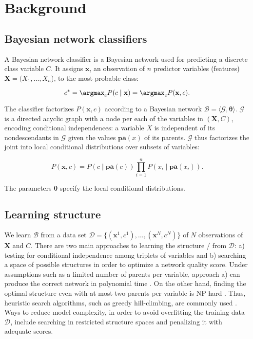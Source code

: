 \section{Background}\label{background}

\label{sec:bcground}

\subsection{Bayesian network
classifiers}\label{bayesian-network-classifiers}

\label{bayesian-networks} A Bayesian network classifier is a Bayesian
network used for predicting a discrete class variable \(C\). It assigns
\(\mathbf{x}\), an observation of \(n\) predictor variables (features)
\(\mathbf{X} = (X_1,\ldots,X_n\)), to the most probable class:

\[ c^* = \argmax_c P(c \mid \mathbf{x}) = \argmax_c P(\mathbf{x}, c).\]

\noindent The classifier factorizes \(P(\mathbf{x}, c)\) according to a
Bayesian network
\(\mathcal{B} = \langle \mathcal{G}, \boldsymbol{ \theta } \rangle\).
\(\mathcal{G}\) is a directed acyclic graph with a node per each of the
variables in \((\mathbf{X}, C)\), encoding conditional independences: a
variable \(X\) is independent of its nondescendants in \(\mathcal{G}\)
given the values \(\mathbf{pa}(x)\) of its parents. \(\mathcal{G}\) thus
factorizes the joint into local conditional distributions over subsets
of variables:

\[P(\mathbf{x}, c) = P(c \mid \mathbf{pa}(c)) \prod_{i=1}^{n} P(x_i \mid \mathbf{pa}(x_i)).\]

\noindent The parameters \(\boldsymbol{ \theta }\) specify the local
conditional distributions.

\subsection{Learning structure}\label{learning-structure}

\label{sec:bkg:learning} We learn \(\mathcal{B}\) from a data set
\(\mathcal{D} = \{ (\mathbf{x}^{1}, c^{1}), \ldots, (\mathbf{x}^{N}, c^{N}) \}\)
of \(N\) observations of \(\mathbf{X}\) and \(C\). There are two main
approaches to learning the structure \gstuc/ from \(\mathcal{D}\): a)
testing for conditional independence among triplets of variables and b)
searching a space of possible structures in order to optimize a network
quality score. Under assumptions such as a limited number of parents per
variable, approach a) can produce the correct network in polynomial time
\citep{cheng-greiner02,Tsamardinos2003a}. On the other hand, finding the
optimal structure even with at most two parents per variable is NP-hard
\citep{Chickering2004}. Thus, heuristic search algorithms, such as
greedy hill-climbing, are commonly used \citep[see e.g.,][]{Koller2009}.
Ways to reduce model complexity, in order to avoid overfitting the
training data \(\mathcal{D}\), include searching in restricted structure
spaces and penalizing it with adequate scores.

